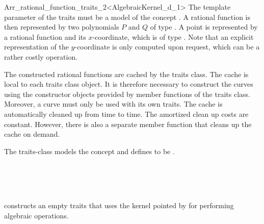 \begin{ccRefClass}{Arr_rational_function_traits_2<AlgebraicKernel_d_1>}
The template parameter of the traits must be a model of the 
concept . 
A rational function is then represented by two polynomials $P$ and $Q$ of type 
. 
A point is represented by a rational function and its $x$-coordinate, which is 
of type . 
Note that an explicit representation of the $y$-coordinate is only computed upon 
request, which can be a rather costly operation. 


The constructed rational functions are cached by the traits class. 
The cache is local to each traits class object. 
It is therefore necessary to construct the curves using the constructor 
objects provided by member functions of the traits class. 
Moreover, a curve must only be used with its own traits. 
The cache is automatically  cleaned up from time to time.
The amortized clean up costs are constant. However, there is also a 
separate member function that cleans up the cache on demand.  

The traits-class models the  concept
and defines  to
be .


\ccIsModel
  \\
  \\ 
  \\

\ccTypes
{} 
\ccGlue
{}\ccGlue
{}\ccGlue
{}\ccGlue
{}


\ccCreation
  {constructs an empty traits that uses the kernel pointed by 
   for performing algebraic operations.}


\end{ccRefClass}

